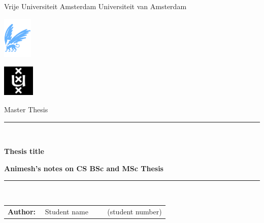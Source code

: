 \documentclass[twoside,11pt]{PhDthesisPSnPDF}
\begin{document}


\thispagestyle{empty}

\begin{center}

\vspace*{-3.5cm}

Vrije Universiteit Amsterdam \hspace*{2cm} Universiteit van Amsterdam

\vspace{1mm}

\hspace*{-6.5cm}\includegraphics[height=20mm]{vu-griffioen.pdf}

\vspace*{-2cm}\hspace*{7.5cm}\includegraphics[height=15mm]{uva_logo.jpg}

\vspace*{1.3cm}
\vspace*{4.5cm}

{\Large Master Thesis}

\vspace*{0.5cm}

\rule{.9\linewidth}{.6pt}\\[0.4cm]
{\huge \bfseries Thesis title  \par}\vspace{0.4cm}
{\large \bfseries Animesh's notes on CS BSc and MSc Thesis \par}\vspace{0.4cm}


\rule{.9\linewidth}{.6pt}\\[1.5cm]

\vspace*{2mm}

{\Large
\begin{tabular}{l}
{\bf Author:} ~~Student name ~~~~ (student number)
\end{tabular}
}

\vspace*{2cm}


\end{center}
\end{document}
